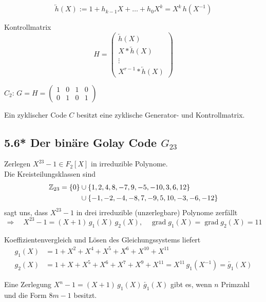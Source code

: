 \begin{definition}
\[
\overleftarrow{h}(X) := 1 + h_{k-1} X + \dots + h_0 X^k = X^k\, h(X^{-1})
\]
\end{definition}

Kontrollmatrix
\[
H = \begin{pmatrix}
\overleftarrow{h}(X) \\ X * \overleftarrow{h}(X) \\ \vdots \\ X^{r-1} * \overleftarrow{h}(X)
\end{pmatrix}
\]

\begin{beispiel}
$C_2$: \quad $G = H = \begin{pmatrix} 1 & 0 & 1 & 0 \\ 0 & 1 & 0 & 1 \end{pmatrix}$
\end{beispiel}

\begin{korollar}[Folgerung]
Ein zyklischer Code $C$ besitzt eine zyklische Generator- und Kontrollmatrix.
\end{korollar}

\subsection{5.6* Der binäre Golay Code $G_{23}$}

Zerlegen $X^{23} - 1 \in F_2[X]$ in irreduzible Polynome.\\
Die Kreisteilungsklassen sind
\begin{align*}
\mathbb{Z}_{23} = \{0\} &\cup \{1, 2, 4, 8, -7, 9, -5, -10, 3, 6, 12\} \\
&\cup \{-1, -2, -4, -8, 7, -9, 5, 10, -3, -6, -12\}
\end{align*}
sagt uns, dass $X^{23} - 1$ in drei irreduzible (unzerlegbare) Polynome zerfällt
\[
\Rightarrow\quad X^{23} - 1 = (X+1)\, g_1(X)\, g_2(X), \quad \operatorname{grad} g_1(X) = \operatorname{grad} g_2(X) = 11
\]

Koeffizientenvergleich und Lösen des Gleichungssystems liefert
\begin{align*}
g_1(X) &= 1 + X^2 + X^4 + X^5 + X^6 + X^{10} + X^{11} \\
g_2(X) &= 1 + X + X^5 + X^6 + X^7 + X^9 + X^{11} = X^{11}\, g_1(X^{-1}) = \overleftarrow{g_1}(X)
\end{align*}

\begin{bemerkung}[Hinweis]
Eine Zerlegung $X^n - 1 = (X+1)\, g_1(X)\, \overleftarrow{g_1}(X)$ gibt es, wenn $n$ Primzahl und die Form $8m - 1$ besitzt.
\end{bemerkung}

